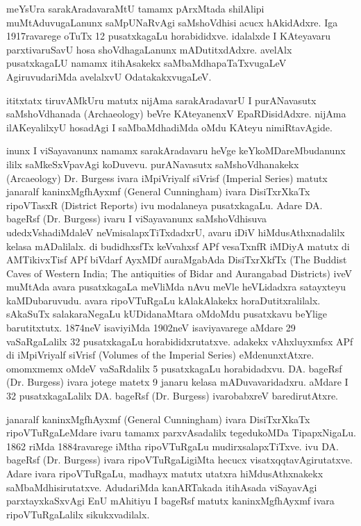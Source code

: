 \documentclass[11pt,a4size]{article}
\begin{document}
meYsUra sarakAradavaraMtU tamamx pArxMtada shilAlipi muMtAduvugaLanunx
saMpUNaRvAgi saMshoVdhisi acucx hAkidAdxre. Iga 1917ravarege oTuTx 12
pusatxkagaLu horabididxve. idalalxde I KAteyavaru parxtivaruSavU hosa
shoVdhagaLanunx mADutitxdAdxre. avelAlx pusatxkagaLU namamx
itihAsakekx saMbaMdhapaTaTxvugaLeV AgiruvudariMda avelalxvU
OdatakakxvugaLeV.

ititxtatx tiruvAMkUru matutx nijAma sarakAradavarU I purANavasutx
saMshoVdhanada {\rm(Archaeology)} beVre KAteyanenxV
EpaRDisidAdxre. nijAma ilAKeyalilxyU hosadAgi I saMbaMdhadiMda oMdu
KAteyu nimiRtavAgide.

inunx I viSayavanunx namamx sarakAradavaru heVge keYkoMDareMbudanunx
ililx saMkeSxVpavAgi koDuvevu. purANavasutx saMshoVdhanakekx
{\rm(Arcaeology) Dr. Burgess} ivara iMpiVriyalf siVrisf
{\rm (Imperial Series)} matutx janaralf kaninxMgfhAyxmf
{\rm (General Cunningham)} ivara DisiTxrXkaTx
ripoVTasxR {\rm (District Reports)} ivu modalaneya
pusatxkagaLu. Adare DA. bageRsf {\rm (Dr. Burgess)}
ivaru I viSayavanunx saMshoVdhisuva udedxVshadiMdaleV
neVmisalapxTiTxdadxrU, avaru iDiV hiMdusAthxnadalilx kelasa
mADalilalx. di budidhxsfTx keVvahxsf APf vesaTxnfR iMDiyA matutx di
AMTikivxTisf APf biVdarf AyxMDf auraMgabAda DisiTxrXkfTx
{\rm (The Buddist Caves of Western India; The
    antiquities of Bidar and Aurangabad Districts)} iveV muMtAda
avara pusatxkagaLa meVliMda nAvu meVle heVLidadxra satayxteyu
kaMDubaruvudu. avara ripoVTuRgaLu kAlakAlakekx
horaDutitxralilalx. sAkaSuTx salakaraNegaLu kUDidanaMtara oMdoMdu
pusatxkavu beYlige barutitxtutx. 1874neV isaviyiMda 1902neV
isaviyavarege aMdare 29 vaSaRgaLalilx 32 pusatxkagaLu
horabididxrutatxve. adakekx vAhxluyxmfsx APf di iMpiVriyalf siVrisf
{\rm (Volumes of the Imperial Series)}
eMdenunxtAtxre. omomxmemx oMdeV vaSaRdalilx 5 pusatxkagaLu
horabidadxvu. DA. bageRsf {\rm (Dr. Burgess)} ivara
jotege matetx 9 janaru kelasa mADuvavaridadxru. aMdare I 32
pusatxkagaLalilx DA. bageRsf {\rm (Dr. Burgess)}
ivarobabxreV baredirutAtxre.

janaralf kaninxMgfhAyxmf {\rm (General Cunningham)}
ivara DisiTxrXkaTx ripoVTuRgaLeMdare ivaru tamamx parxvAsadalilx
tegedukoMDa TipapxNigaLu. 1862 riMda 1884ravarege iMtha ripoVTuRgaLu
mudirxsalapxTiTxve. ivu DA. bageRsf {\rm (Dr. Burgess)}
ivara ripoVTuRgaLigiMta hecucx visatxqqtavAgirutatxve. Adare ivara
ripoVTuRgaLu, madhayx matutx utatxra hiMdusAthxnakekx
saMbaMdhisirutatxve. AdudariMda kanARTakada itihAsada viSayavAgi
parxtayxkaSxvAgi EnU mAhitiyu I bageRsf matutx kaninxMgfhAyxmf ivara
ripoVTuRgaLalilx sikukxvadilalx.
\end{document}

